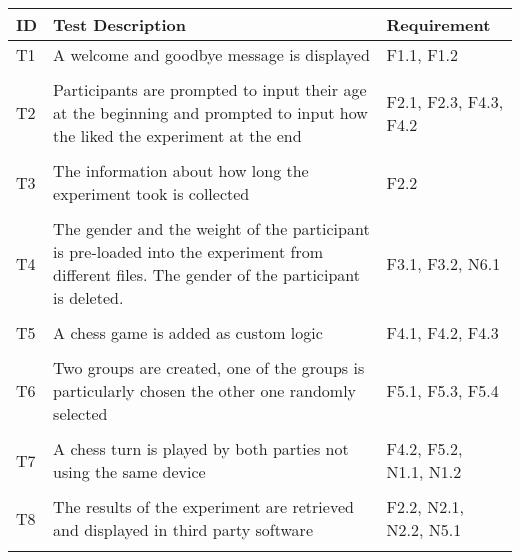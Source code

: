 \begin{table}[htbp]
    \centering
    \small
    \begin{tabular}{L{0.04\textwidth}L{0.7\textwidth}L{0.15\textwidth}}
    \hline
    ID  & Test Description                                                                                                                                     & Requirement                  \\ \hline
    T1  & A welcome and goodbye message is displayed                                                                                               & F1.1, F1.2                 \\
    & \\
    T2  & Participants are prompted to input their age at the beginning and prompted to input how the liked the experiment at the end              & F2.1, F2.3, F4.3, F4.2 \\
    & \\
    T3  & The information about how long the experiment took is collected                                                                          & F2.2                         \\
    & \\
    T4  & The gender and the weight of the participant is pre-loaded into the experiment from different files. The gender of the participant is deleted. & F3.1, F3.2, N6.1                         \\
    & \\
    T5  & A chess game is added as custom logic                                                                                                    &  F4.1, F4.2, F4.3         \\
    & \\
    T6  & Two groups are created, one of the groups is particularly chosen the other one randomly selected                                           & F5.1, F5.3, F5.4         \\
    & \\
    T7  & A chess turn is played by both parties not using the same device                                                                         & F4.2, F5.2, N1.1, N1.2         \\
    & \\
    T8  & The results of the experiment are retrieved and displayed in third party software                                                        & F2.2, N2.1, N2.2, N5.1                \\
    & \\

\end{tabular}
\end{table}
